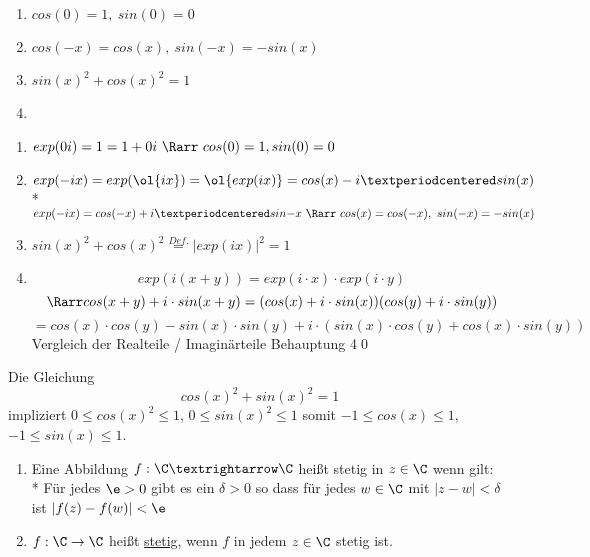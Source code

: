 \begin{enumerate}
\item{$cos(0)=1,\ sin(0)=0$
}
\item{$cos(-x)=cos(x),\ sin(-x)=-sin(x)$}
\item{$sin(x)^2+cos(x)^2=1$
}
\item{}
\end{enumerate}
\bew
\begin{enumerate}
\item{$exp(0i)=1=1+0i\ \Rarr\ cos(0)=1, sin(0)=0$}
\item{$exp(-ix)=exp(\ol{ix})=\ol{exp(ix)}=cos(x)-i·sin(x)$\\*
$exp(-ix)=cos(-x)+i·sin{-x}\ \Rarr\ cos(x)=cos(-x),\ sin(-x)=-sin(x)$}
\item{$sin(x)^2+cos(x)^2\overset{Def.}{=}|exp(ix)|^2=1$}
\item{$$exp(i(x+y)) = exp(i \cdot x) \cdot exp(i \cdot y)$$
$$\Rarr cos(x+y) + i \cdot sin(x+y) = (cos(x) + i \cdot sin(x))(cos(y) + i \cdot sin(y))$$
$$=cos(x) \cdot cos(y) - sin(x) \cdot sin(y) + i \cdot (sin(x) \cdot cos(y) + cos(x) \cdot sin(y))$$
Vergleich der Realteile / Imaginärteile \Rarr{} Behauptung 4\qed}
\end{enumerate}
\bem
	Die Gleichung $$cos(x)^2 + sin(x)^2 = 1$$
	impliziert $0 \leq cos(x)^2 \leq 1$, $0 \leq sin(x)^2 \leq 1$ somit $-1 \leq cos(x) \leq 1$, $-1 \leq sin(x) \leq 1$.

	\begin{enumerate}
	\item{Eine Abbildung $f: \C→\C$ heißt stetig in $z \in \C$ wenn gilt:\\*
	Für jedes $\e > 0$ gibt es ein $\delta > 0$ so dass für jedes $w \in \C$ mit $|z - w| < \delta$ ist $|f(z) - f(w)| < \e$}
	\item{$f: \C \to \C$ heißt \ul{stetig}, wenn $f$ in jedem $z \in \C$ stetig ist.}
	\end{enumerate}

